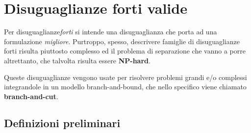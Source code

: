 \documentclass[\main/main.tex]{subfiles}
\begin{document}
\chapter{Disuguaglianze forti valide}
Per disuguaglianze\textit{forti} si intende una disuguaglianza che porta ad una formulazione \textit{migliore}. Purtroppo, spesso, descrivere famiglie di disuguaglianze forti risulta piuttosto complesso ed il problema di separazione che vanno a porre altrettanto, che talvolta risulta essere \textbf{NP-hard}.

Queste disuguaglianze vengono usate per risolvere problemi grandi e/o complessi integrandole in un modello branch-and-bound, che nello specifico viene chiamato \textbf{branch-and-cut}.

\section{Definizioni preliminari}
\end{document}
